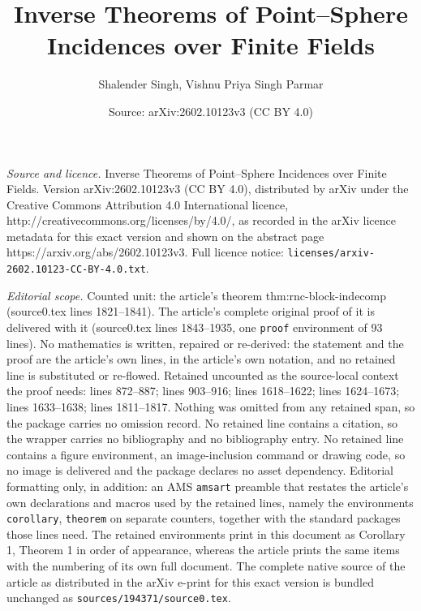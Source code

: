 \documentclass[10pt,a4paper]{amsart}
\title{Inverse Theorems of Point--Sphere Incidences over Finite Fields}
\author{Shalender Singh, Vishnu Priya Singh Parmar}
\date{Source: arXiv:2602.10123v3 (CC BY 4.0)}
\begin{document}
\maketitle

\noindent\emph{Source and licence.} Inverse Theorems of Point--Sphere Incidences over Finite Fields. Version arXiv:2602.10123v3 (CC BY 4.0), distributed by arXiv under the Creative Commons Attribution 4.0 International licence, http://creativecommons.org/licenses/by/4.0/, as recorded in the arXiv licence metadata for this exact version and shown on the abstract page https://arxiv.org/abs/2602.10123v3. Full licence notice: \texttt{licenses/arxiv-2602.10123-CC-BY-4.0.txt}.\par\smallskip

\noindent\textit{Editorial scope.} Counted unit: the article's theorem thm:rnc-block-indecomp (source0.tex lines 1821--1841). The article's complete original proof of it is delivered with it (source0.tex lines 1843--1935, one \texttt{proof} environment of 93 lines). No mathematics is written, repaired or re-derived: the statement and the proof are the article's own lines, in the article's own notation, and no retained line is substituted or re-flowed.  Retained uncounted as the source-local context the proof needs: lines 872--887; lines 903--916; lines 1618--1622; lines 1624--1673; lines 1633--1638; lines 1811--1817.  Nothing was omitted from any retained span, so the package carries no omission record.  No retained line contains a citation, so the wrapper carries no bibliography and no bibliography entry.  No retained line contains a figure environment, an image-inclusion command or drawing code, so no image is delivered and the package declares no asset dependency.  Editorial formatting only, in addition: an AMS \texttt{amsart} preamble that restates the article's own declarations and macros used by the retained lines, namely the environments \texttt{corollary}, \texttt{theorem} on separate counters, together with the standard packages those lines need.  The retained environments print in this document as Corollary 1, Theorem 1 in order of appearance, whereas the article prints the same items with the numbering of its own full document.  The complete native source of the article as distributed in the arXiv e-print for this exact version is bundled unchanged as \texttt{sources/194371/source0.tex}.
\end{document}

